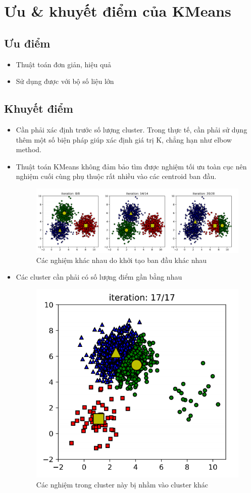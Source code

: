 \section{Ưu \& khuyết điểm của KMeans}
\subsection{Ưu điểm}
\begin{itemize}
	\item Thuật toán đơn giản, hiệu quả
	\item Sử dụng được với bộ số liệu lớn
\end{itemize}
\subsection{Khuyết điểm}
\begin{itemize}
	\item Cần phải xác định trước số lượng cluster. Trong thực tế, cần phải sử dụng thêm một số biện pháp giúp xác định giá trị K, chẳng hạn như elbow method.
	\item Thuật toán KMeans không đảm bảo tìm được nghiệm tối ưu toàn cục nên nghiệm cuối cùng phụ thuộc rất nhiều vào các centroid ban đầu.\\
	\begin{figure}[h]
		\centering
		\includegraphics[width=0.7\linewidth]{img/disad_1}
		\caption{Các nghiệm khác nhau do khởi tạo ban đầu khác nhau}
	\end{figure}
	\item Các cluster cần phải có số lượng điểm gần bằng nhau\\
	\begin{figure}[h]
		\centering
		\includegraphics[width=0.3\linewidth]{img/disad_2}
		\caption{Các nghiệm trong cluster này bị nhầm vào cluster khác}

\end{figure}
\end{itemize}
